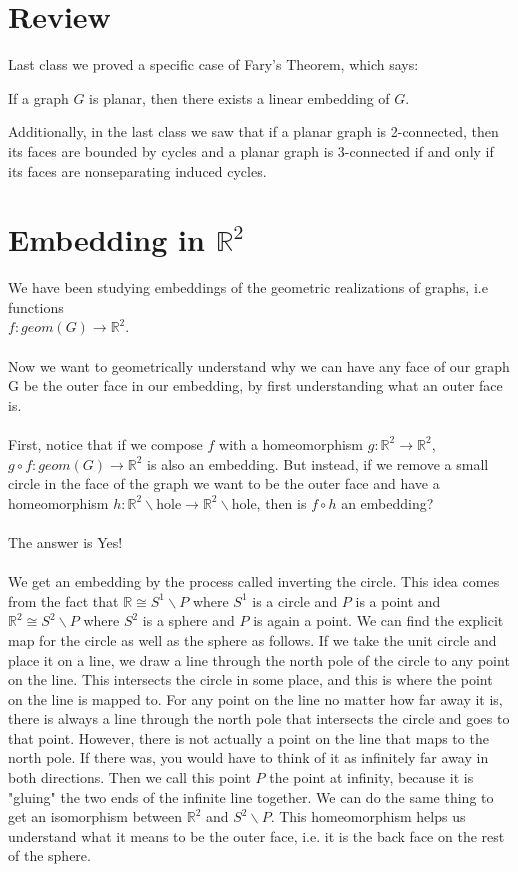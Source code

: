\documentclass{article}
\begin{document}

\section{Review}
Last class we proved a specific case of Fary's Theorem, which says:
\begin{theorem}[Fary]
If a graph $G$ is planar, then there exists a linear embedding of $G$.
\end{theorem}
Additionally, in the last class we saw that if a planar graph is 2-connected, then its faces are bounded by cycles and a planar graph is 3-connected if and only if its faces are nonseparating induced cycles. \\
\section{Embedding in $\mathbb{R}^2$}
We have been studying embeddings of  the geometric realizations of graphs, i.e functions \\$f:geom(G)\to \mathbb{R}^2$.
\\\\ Now we want to geometrically understand why we can have any face of our graph G be the outer face in our embedding, by first understanding what an outer face is.
\\\\ First, notice that if we compose $f$ with a homeomorphism $g:\mathbb{R}^2\to \mathbb{R}^2$, $g\circ f: geom(G)\to \mathbb{R}^2$ is also an embedding. But instead, if we remove a small circle in the face of the graph we want to be the outer face and have a homeomorphism $h: \mathbb{R}^2\backslash$hole$\to \mathbb{R}^2\backslash$hole, then is $f\circ h$ an embedding?
\\\\
The answer is Yes!
\\\\
We get an embedding by the process called inverting the circle. This idea comes from the fact that $\mathbb{R} \cong S^1 \backslash P$ where $S^1$ is a circle and $P$ is a point and $\mathbb{R}^2 \cong S^2 \backslash P$ where $S^2$ is a sphere and $P$ is again a point. We can find the explicit map for the circle as well as the sphere as follows. If we take the unit circle and place it on a line, we draw a line through the north pole of the circle to any point on the line. This intersects the circle in some place, and this is where the point on the line is mapped to. For any point on the line no matter how far away it is, there is always a line through the north pole that intersects the circle and goes to that point. However, there is not actually a point on the line that  maps to the north pole. If there was, you would have to think of it as infinitely far away in both directions. Then we call this point $P$ the point at infinity, because it is "gluing" the two ends of the infinite line together. We can do the same thing to get an isomorphism between $\mathbb{R}^2$ and $S^2 \backslash P$. This homeomorphism helps us understand what it means to be the outer face, i.e. it is the back face on the rest of the sphere. \\
\end{document}
